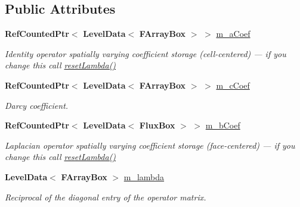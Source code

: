 \subsection*{Public Attributes}
\begin{DoxyCompactItemize}
\item 
\mbox{\label{class_darcy_brinkman_op_a7e1b9891159ab88e702382380c253758}} 
\textbf{ Ref\+Counted\+Ptr}$<$ \textbf{ Level\+Data}$<$ \textbf{ F\+Array\+Box} $>$ $>$ \hyperlink{class_darcy_brinkman_op_a7e1b9891159ab88e702382380c253758}{m\+\_\+a\+Coef}
\begin{DoxyCompactList}\small\item\em Identity operator spatially varying coefficient storage (cell-\/centered) --- if you change this call \hyperlink{class_darcy_brinkman_op_a35fa524145af3a0641f10817ce291b0b}{reset\+Lambda()} \end{DoxyCompactList}\item 
\mbox{\label{class_darcy_brinkman_op_a6fd695093ab30f1ce1de57c4eb3f0d1e}} 
\textbf{ Ref\+Counted\+Ptr}$<$ \textbf{ Level\+Data}$<$ \textbf{ F\+Array\+Box} $>$ $>$ \hyperlink{class_darcy_brinkman_op_a6fd695093ab30f1ce1de57c4eb3f0d1e}{m\+\_\+c\+Coef}
\begin{DoxyCompactList}\small\item\em Darcy coefficient. \end{DoxyCompactList}\item 
\mbox{\label{class_darcy_brinkman_op_a2363c28bf18a93ddd9096973959fb299}} 
\textbf{ Ref\+Counted\+Ptr}$<$ \textbf{ Level\+Data}$<$ \textbf{ Flux\+Box} $>$ $>$ \hyperlink{class_darcy_brinkman_op_a2363c28bf18a93ddd9096973959fb299}{m\+\_\+b\+Coef}
\begin{DoxyCompactList}\small\item\em Laplacian operator spatially varying coefficient storage (face-\/centered) --- if you change this call \hyperlink{class_darcy_brinkman_op_a35fa524145af3a0641f10817ce291b0b}{reset\+Lambda()} \end{DoxyCompactList}\item 
\mbox{\label{class_darcy_brinkman_op_ab4521803f9a322aa5a1113f642e3a054}} 
\textbf{ Level\+Data}$<$ \textbf{ F\+Array\+Box} $>$ \hyperlink{class_darcy_brinkman_op_ab4521803f9a322aa5a1113f642e3a054}{m\+\_\+lambda}
\begin{DoxyCompactList}\small\item\em Reciprocal of the diagonal entry of the operator matrix. \end{DoxyCompactList}\end{DoxyCompactItemize}
